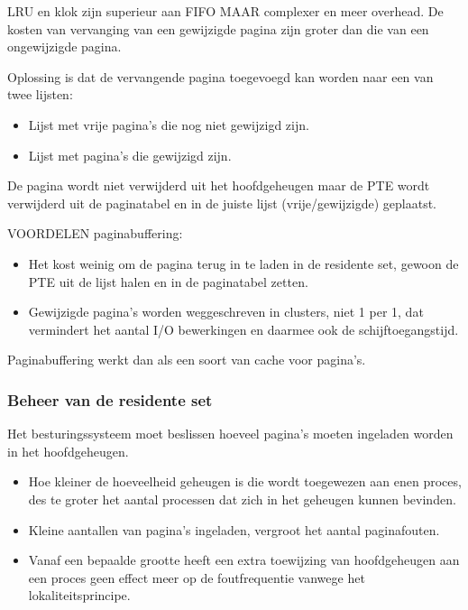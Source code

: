 LRU en klok zijn superieur aan FIFO MAAR complexer en meer overhead. De kosten van vervanging van een gewijzigde pagina zijn groter dan die van een ongewijzigde pagina.

Oplossing is dat de vervangende pagina toegevoegd kan worden naar een van twee lijsten:

\begin{itemize}
\item Lijst met vrije pagina’s die nog niet gewijzigd zijn.
\item Lijst met pagina’s die gewijzigd zijn.
\end{itemize}

De pagina wordt niet verwijderd uit het hoofdgeheugen maar de PTE wordt verwijderd uit de paginatabel en in de juiste lijst (vrije/gewijzigde) geplaatst.

VOORDELEN paginabuffering:


\begin{itemize}
\item Het kost weinig om de pagina terug in te laden in de residente set, gewoon de PTE uit de lijst halen en in de paginatabel zetten.
\item Gewijzigde pagina's worden weggeschreven in clusters, niet 1 per 1, dat vermindert het aantal I/O bewerkingen en daarmee ook de schijftoegangstijd.
\end{itemize}


Paginabuffering werkt dan als een soort van cache voor pagina's.


\subsubsection{Beheer van de residente set}

Het besturingssysteem moet beslissen hoeveel pagina’s moeten ingeladen worden in het hoofdgeheugen.

\begin{itemize}
\item Hoe kleiner de hoeveelheid geheugen is die wordt toegewezen aan enen proces, des te groter het aantal processen dat zich in het geheugen kunnen bevinden.
\item Kleine aantallen van pagina’s ingeladen, vergroot het aantal paginafouten.
\item Vanaf een bepaalde grootte heeft een extra toewijzing van hoofdgeheugen aan een proces geen effect meer op de foutfrequentie vanwege het lokaliteitsprincipe.
\end{itemize}

